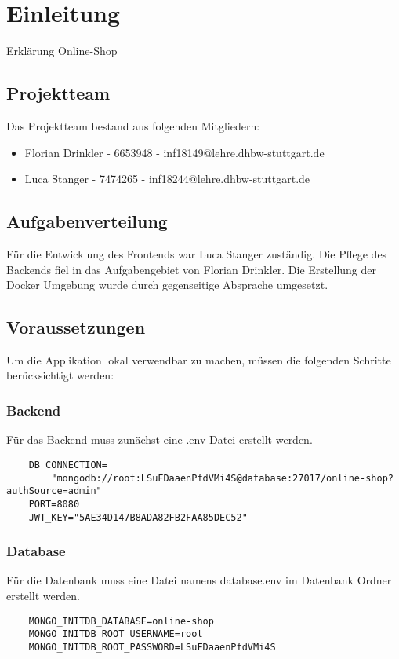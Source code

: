 
\chapter{Einleitung}\label{ch:einleitung}
Erklärung Online-Shop
\section{Projektteam}\label{sec:projektteam}
Das Projektteam bestand aus folgenden Mitgliedern:
\begin{itemize}
	\item Florian Drinkler - 6653948 - inf18149@lehre.dhbw-stuttgart.de
	\item Luca Stanger - 7474265 - inf18244@lehre.dhbw-stuttgart.de
\end{itemize}
\section{Aufgabenverteilung}\label{sec:aufgabenverteilung}
Für die Entwicklung des Frontends war Luca Stanger zuständig. Die Pflege des Backends fiel in das Aufgabengebiet von Florian Drinkler. Die Erstellung der Docker Umgebung wurde durch gegenseitige Absprache umgesetzt.
\newpage
\section{Voraussetzungen}
Um die Applikation lokal verwendbar zu machen, müssen die folgenden Schritte berücksichtigt werden:

\subsection*{Backend}
Für das Backend muss zunächst eine .env Datei erstellt werden. 

\begin{verbatim}
	DB_CONNECTION=
		"mongodb://root:LSuFDaaenPfdVMi4S@database:27017/online-shop?authSource=admin"
	PORT=8080
	JWT_KEY="5AE34D147B8ADA82FB2FAA85DEC52"
\end{verbatim}

\subsection*{Database}
Für die Datenbank muss eine Datei namens database.env im Datenbank Ordner erstellt werden.
\begin{verbatim}
	MONGO_INITDB_DATABASE=online-shop
	MONGO_INITDB_ROOT_USERNAME=root
	MONGO_INITDB_ROOT_PASSWORD=LSuFDaaenPfdVMi4S
\end{verbatim}

